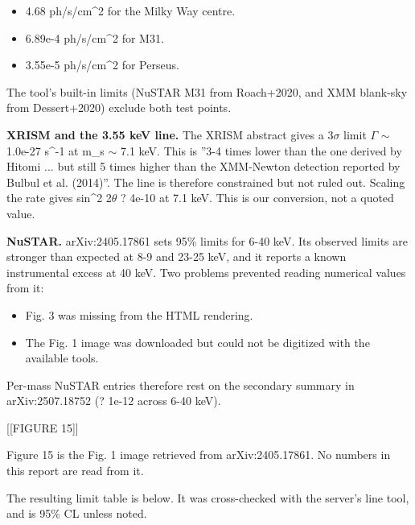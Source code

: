 \documentclass[11pt,a4paper]{article}
\begin{document}
\begin{itemize}
  \item 4.68 ph/s/cm\textasciicircum{}2 for the Milky Way centre.
  \item 6.89e-4 ph/s/cm\textasciicircum{}2 for M31.
  \item 3.55e-5 ph/s/cm\textasciicircum{}2 for Perseus.
\end{itemize}
The tool's built-in limits (NuSTAR M31 from Roach+2020, and XMM blank-sky from Dessert+2020) exclude both test points.

\textbf{XRISM and the 3.55 keV line.} The XRISM abstract gives a 3$\sigma$ limit $\Gamma$ $\sim$ 1.0e-27 s\textasciicircum{}-1 at m\_s $\sim$ 7.1 keV. This is ''3-4 times lower than the one derived by Hitomi ... but still 5 times higher than the XMM-Newton detection reported by Bulbul et al. (2014)''. The line is therefore constrained but not ruled out. Scaling the rate gives sin\textasciicircum{}2 2$\theta$ ? 4e-10 at 7.1 keV. This is our conversion, not a quoted value.

\textbf{NuSTAR.} arXiv:2405.17861 sets 95\% limits for 6-40 keV. Its observed limits are stronger than expected at 8-9 and 23-25 keV, and it reports a known instrumental excess at 40 keV. Two problems prevented reading numerical values from it:

\begin{itemize}
  \item Fig. 3 was missing from the HTML rendering.
  \item The Fig. 1 image was downloaded but could not be digitized with the available tools.
\end{itemize}
Per-mass NuSTAR entries therefore rest on the secondary summary in arXiv:2507.18752 (? 1e-12 across 6-40 keV).

[[FIGURE 15]]

Figure 15 is the Fig. 1 image retrieved from arXiv:2405.17861. No numbers in this report are read from it.

The resulting limit table is below. It was cross-checked with the server's line tool, and is 95\% CL unless noted.
\end{document}
